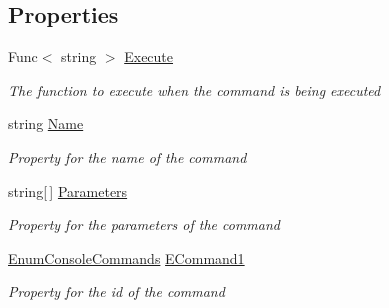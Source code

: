 \subsection*{Properties}
\begin{DoxyCompactItemize}
\item 
Func$<$ string $>$ \hyperlink{class_c_p_u___o_s___simulator_1_1_console_1_1_console_command_a9b4fd5675ec062a721c2e5e78022117b}{Execute}
\begin{DoxyCompactList}\small\item\em The function to execute when the command is being executed \end{DoxyCompactList}\item 
string \hyperlink{class_c_p_u___o_s___simulator_1_1_console_1_1_console_command_a4ecb871520e9d6453edc4d59d81c5f54}{Name}
\begin{DoxyCompactList}\small\item\em Property for the name of the command \end{DoxyCompactList}\item 
string\mbox{[}$\,$\mbox{]} \hyperlink{class_c_p_u___o_s___simulator_1_1_console_1_1_console_command_a0c21b7943f52a37bcc2481b40202d064}{Parameters}
\begin{DoxyCompactList}\small\item\em Property for the parameters of the command \end{DoxyCompactList}\item 
\hyperlink{namespace_c_p_u___o_s___simulator_1_1_console_a5d9f2366d41d3eb074f056be426272d7}{Enum\+Console\+Commands} \hyperlink{class_c_p_u___o_s___simulator_1_1_console_1_1_console_command_ae96cab2ae94ba9ee4a18130e7c8f2866}{E\+Command1}
\begin{DoxyCompactList}\small\item\em Property for the id of the command \end{DoxyCompactList}\end{DoxyCompactItemize}
